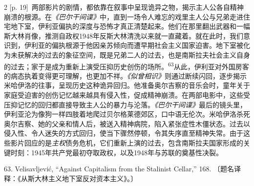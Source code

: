 \documentclass[10pt,a4paper]{article}
\begin{document}
\begin{paracol}{2}
{\scriptsize\color{gray} [p. 19]}\ 两部影片的剧情，都依靠在叙事中呈现诡异之物，揭示主人公各自精神崩溃的根源。在\textit{《巴尔干间谍》}中，直到一场令人难忘的戏里主人公与兄弟走进住宅地下室，伊利亚偏执的深度与恐怖才真正清楚起来。他们在那里翻出武器和一幅斯大林肖像，推测自政权1948年反斯大林清洗以来就一直藏着。就在此时，我们意识到，伊利亚的偏执根源于他因亲苏倾向而遭早期社会主义国家迫害。地下室被化为未获解决的过去的象征空间，既是兄弟二人的过去，也是南斯拉夫社会主义自身的过去；家于是成为重新上演受压抑历史创伤的场\mbox{所。\textsuperscript{63}}从此，伊利亚对外国房客的病态执着变得更可理解，也更加不祥。\textit{《似曾相识》}则通过断续闪回，逐步揭示米哈伊洛的往事，呈现历史这种诡异回归。他准备奥尔吉察的音乐会时，童年关于家庭受迫害的创伤记忆越来越具有侵入性，促成精神崩溃。在两部电影中，这些受压抑记忆的回归都直接导致主人公的暴力与沦落。\textit{《巴尔干间谍》}最后的镜头里，伊利亚沦为像狗一样四肢着地爬过贝尔格莱德郊区，口中语无伦次。米哈伊洛杀死奥尔吉察、她的父亲和情人后，被送入精神病院，陷入紧张症性木僵状态。过去以侵入性、令人迷失的方式回归，使当下骤然停顿，令其失序直至精神失常。由于这些影片回应的是\textit{主权}债务危机，它们重新上演的过去，包含南斯拉夫国家形成的关键时刻：1945年共产党最初夺取政权，以及1948年与苏联的奠基性决裂。\par{\small 63. Velisavljević, “Against Capitalism from the Stalinist Cellar,” 168. 〔题名译释：《从斯大林主义地下室反对资本主义》。〕\par}
\switchcolumn

\end{paracol}
\end{document}
